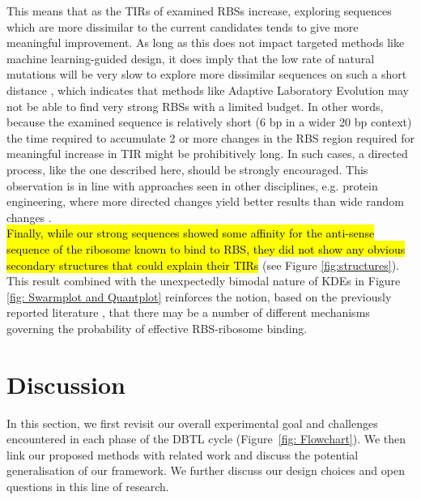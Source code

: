 \documentclass{article}
\begin{document}
This means that as the TIRs of examined RBSs increase, exploring sequences which are more dissimilar to the current candidates tends to give more meaningful improvement.
As long as this does not impact targeted methods like machine learning-guided design, it does imply that the low rate of natural mutations will be very slow to explore more dissimilar sequences on such a short distance \cite{Lee2012}, which indicates that methods like Adaptive Laboratory Evolution may not be able to find very strong RBSs with a limited budget.
In other words, because the examined sequence is relatively short (6 bp in a wider 20 bp context) the time required to accumulate 2 or more changes in the RBS region required for meaningful increase in TIR might be prohibitively long.
In such cases, a directed process, like the one described here, should be strongly encouraged.
This observation is in line with approaches seen in other disciplines, e.g. protein engineering, where more directed changes yield better results than wide random changes \cite{Jackel2008}.\\

\hl{Finally, while our strong sequences showed some affinity for the anti-sense sequence of the ribosome known to bind to RBS, they did not show any obvious secondary structures that could explain their TIRs} (see Figure \ref{fig:structures}).
This result combined with the unexpectedly bimodal nature of KDEs in Figure \ref{fig: Swarmplot and Quantplot} reinforces the notion, based on the previously reported literature \cite{Saito2020,EspahBorujeni2016}, that there may be a number of different mechanisms governing the probability of effective RBS-ribosome binding.\\



\section{Discussion}

In this section, we first revisit our overall experimental goal and challenges encountered in each phase of the
DBTL cycle (Figure~\ref{fig: Flowchart}).
We then link our proposed methods with related work and discuss the potential generalisation of our framework.
We further discuss our design choices and open questions in this line of research.\\ 
\end{document}
